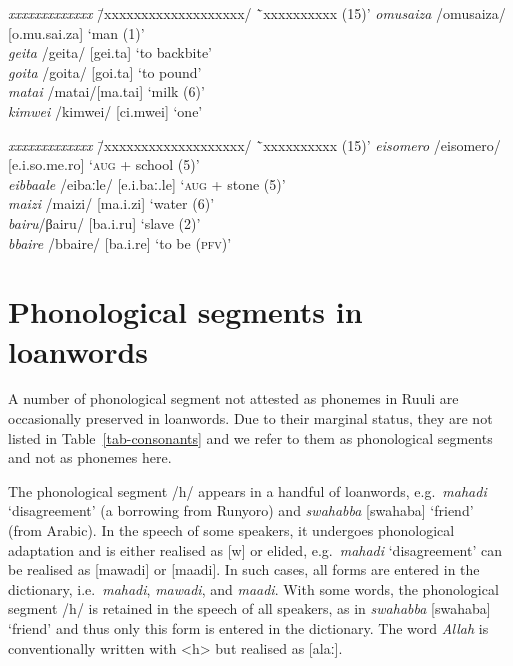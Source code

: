\ea \label{ex-phono-tautosyllabic-sequences}
\begin{tabbing}
	 \textit{xxxxxxxxxxxxx} \= /xxxxxxxxxxxxxxxxxxx/ \=`xxxxxxxxxx (15)'\kill
	 \textit{omusaiza} \> /omusaiza/ [o.mu.sai.za] \> `man (1)'\\
	 \textit{geita}  \> /geita/ [gei.ta]  \>`to backbite'\\
	 \textit{goita}  \> /goita/ [goi.ta]  \>`to pound'\\
	 \textit{matai} \> /matai/[ma.tai]  \>`milk (6)'\\ 	
	 \textit{kimwei} \> /kimwei/ [ci.mwei]  \>`one'\\
\end{tabbing}
\z

\ea \label{ex-phono-heterosyllabic-sequences}
\begin{tabbing}
	 \textit{xxxxxxxxxxxxx} \= /xxxxxxxxxxxxxxxxxxx/ \=`xxxxxxxxxx (15)'\kill	
	 \textit{eisomero} \> /eisomero/ [e.i.so.me.ro] \>`\textsc{aug} + school (5)'\\
	 \textit{eibbaale}\> /eibaːle/ [e.i.baː.le]\> `\textsc{aug} + stone (5)'\\
	 \textit{maizi} \>/maizi/ [ma.i.zi] \>`water (6)'\\
	 \textit{bairu}\>/βairu/ [ba.i.ru] \>`slave (2)'\\ 
	 \textit{bbaire} \>/bbaire/ [ba.i.re] \>`to be (\textsc{pfv})'
\end{tabbing}
\z

\section{Phonological segments in loanwords}  

A number of phonological segment not attested as phonemes in Ruuli are occasionally preserved in loanwords. Due to their marginal status, they are not listed in Table~\ref{tab-consonants} and we refer to them as phonological segments and not as phonemes here. 

The phonological segment /h/ appears in a handful of loanwords, e.g.\, \textit{mahadi}  ‘disagreement’ (a borrowing from Runyoro) and  \textit{swahabba} [swahaba] `friend' (from Arabic). 
In the speech of some speakers, it undergoes phonological adaptation and is either realised as [w] or elided, e.g.\, \textit{mahadi} ‘disagreement’ can be realised as [mawadi] or [maadi].  
In such cases, all forms are entered in the dictionary, i.e.\, \textit{mahadi},  \textit{mawadi}, and  \textit{maadi}. 
With some words, the phonological segment  /h/ is retained in the speech of all speakers, as in  \textit{swahabba} [swahaba] `friend' and thus only this form is entered in the dictionary. 
The word  \textit{Allah} is conventionally written with <h> but realised as [alaː].

